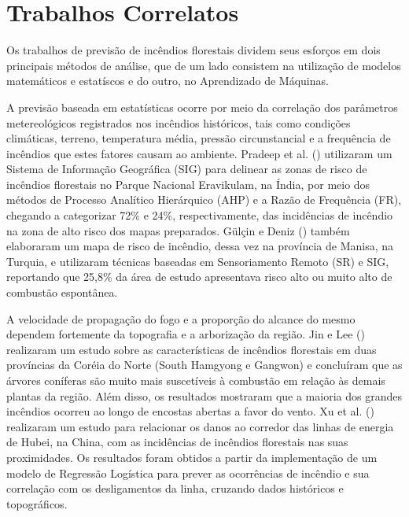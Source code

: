 \documentclass[tcc2]{uftex}
\begin{document}
\section{Trabalhos Correlatos}

Os trabalhos de previsão de incêndios florestais dividem seus esforços em dois principais métodos de análise, que de um lado consistem na utilização de modelos matemáticos e estatíscos e do outro, no Aprendizado de Máquinas.

A previsão baseada em estatísticas ocorre por meio da correlação dos parâmetros metereológicos registrados nos incêndios históricos, tais como condições climáticas, terreno, temperatura média, pressão circunstancial e a frequência de incêndios que estes fatores causam ao ambiente. Pradeep et al. (\citeyear{pradeep2022eravikulam}) utilizaram um Sistema de Informação Geográfica (SIG) para delinear as zonas de risco de incêndios florestais no Parque Nacional Eravikulam, na Índia, por meio dos métodos de Processo Analítico Hierárquico (AHP) e a Razão de Frequência (FR), chegando a categorizar 72\% e 24\%, respectivamente, das incidências de incêndio na zona de alto risco dos mapas preparados. Gülçin e Deniz (\citeyear{gulcin2020manisa}) também elaboraram um mapa de risco de incêndio, dessa vez na província de Manisa, na Turquia, e utilizaram técnicas baseadas em Sensoriamento Remoto (SR) e SIG, reportando que 25,8\% da área de estudo apresentava risco alto ou muito alto de combustão espontânea.

A velocidade de propagação do fogo e a proporção do alcance do mesmo dependem fortemente da topografia e a arborização da região. Jin e Lee (\citeyear{jin2022northkorea}) realizaram um estudo sobre as características de incêndios florestais em duas províncias da Coréia do Norte (South Hamgyong e Gangwon) e concluíram que as árvores coníferas são muito mais suscetíveis à combustão em relação às demais plantas da região. Além disso, os resultados mostraram que a maioria dos grandes incêndios ocorreu ao longo de encostas abertas a favor do vento. Xu et al. (\citeyear{xu2016hubei}) realizaram um estudo para relacionar os danos ao corredor das linhas de energia de Hubei, na China, com as incidências de incêndios florestais nas suas proximidades. Os resultados foram obtidos a partir da implementação de um modelo de Regressão Logística para prever as ocorrências de incêndio e sua correlação com os desligamentos da linha, cruzando dados históricos e topográficos.
\end{document}
